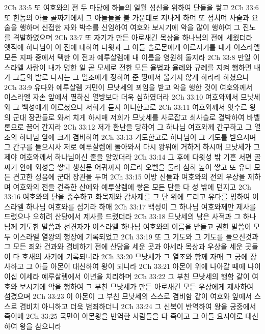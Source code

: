 2Ch 33:5  또 여호와의 전 두 마당에 하늘의 일월 성신을 위하여 단들을 쌓고
2Ch 33:6  또 힌놈의 아들 골짜기에서 그 아들들을 불 가운데로 지나게 하며 또 점치며 사술과 요술을 행하며 신접한 자와 박수를 신임하여 여호와 보시기에 악을 많이 행하여 그 진노를 격발하였으며
2Ch 33:7  또 자기가 만든 아로새긴 목상을 하나님의 전에 세웠더라 옛적에 하나님이 이 전에 대하여 다윗과 그 아들 솔로몬에게 이르시기를 내가 이스라엘 모든 지파 중에서 택한 이 전과 예루살렘에 내 이름을 영원히 둘지라
2Ch 33:8  만일 이스라엘 사람이 내가 명한 일 곧 모세로 전한 모든 율법과 율례와 규례를 지켜 행하면 내가 그들의 발로 다시는 그 열조에게 정하여 준 땅에서 옮기지 않게 하리라 하셨으나
2Ch 33:9  유다와 예루살렘 거민이 므낫세의 꾀임을 받고 악을 행한 것이 여호와께서 이스라엘 자손 앞에서 멸하신 열방보다 더욱 심하였더라
2Ch 33:10  여호와께서 므낫세와 그 백성에게 이르셨으나 저희가 듣지 아니한고로
2Ch 33:11  여호와께서 앗수르 왕의 군대 장관들로 와서 치게 하시매 저희가 므낫세를 사로잡고 쇠사슬로 결박하여 바벨론으로 끌어 간지라
2Ch 33:12  저가 환난을 당하여 그 하나님 여호와께 간구하고 그 열조의 하나님 앞에 크게 겸비하여
2Ch 33:13  기도한고로 하나님이 그 기도를 받으시며 그 간구를 들으시사 저로 예루살렘에 돌아와서 다시 왕위에 거하게 하시매 므낫세가 그제야 여호와께서 하나님이신 줄을 알았더라
2Ch 33:14  그 후에 다윗성 밖 기혼 서편 골짜기 안에 외성을 쌓되 생선문 어귀까지 이르러 오벨을 둘러 심히 높이 쌓고 또 유다 모든 견고한 성읍에 군대 장관을 두며
2Ch 33:15  이방 신들과 여호와의 전의 우상을 제하며 여호와의 전을 건축한 산에와 예루살렘에 쌓은 모든 단을 다 성 밖에 던지고
2Ch 33:16  여호와의 단을 중수하고 화목제와 감사제를 그 단 위에 드리고 유다를 명하여 이스라엘 하나님 여호와를 섬기라 하매
2Ch 33:17  백성이 그 하나님 여호와께만 제사를 드렸으나 오히려 산당에서 제사를 드렸더라
2Ch 33:18  므낫세의 남은 사적과 그 하나님께 기도한 말씀과 선견자가 이스라엘 하나님 여호와의 이름을 받들고 권한 말씀이 모두 이스라엘 열왕의 행장에 기록되었고
2Ch 33:19  또 그 기도와 그 기도를 들으신것과 그 모든 죄와 건과와 겸비하기 전에 산당을 세운 곳과 아세라 목상과 우상을 세운 곳들이 다 호새의 사기에 기록되니라
2Ch 33:20  므낫세가 그 열조와 함께 자매 그 궁에 장사하고 그 아들 아몬이 대신하여 왕이 되니라
2Ch 33:21  아몬이 위에 나아갈 때에 나이 이십 이세라 예루살렘에서 이년을 치리하며
2Ch 33:22  그 부친 므낫세의 행함 같이 여호와 보시기에 악을 행하여 그 부친 므낫세가 만든 아로새긴 모든 우상에게 제사하여 섬겼으며
2Ch 33:23  이 아몬이 그 부친 므낫세의 스스로 겸비함 같이 여호와 앞에서 스스로 겸비치 아니하고 더욱 범죄하더니
2Ch 33:24  그 신복이 반역하여 왕을 궁중에서 죽이매
2Ch 33:25  국민이 아몬왕을 반역한 사람들을 다 죽이고 그 아들 요시야로 대신하여 왕을 삼으니라
